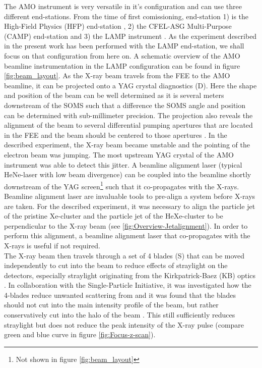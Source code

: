 The AMO instrument is very versatile in it's configuration and can use three different end-stations. From the time of first comissioning, end-station 1) is the High-Field Physics (HFP) end-station \citep{Bozek-2009-EPJST,Bostedt-2013-JPB}, 2) the CFEL-ASG Multi-Purpose (CAMP) end-station \citep{Strueder-2010-NIMPA} and 3) the LAMP instrument \citep{Ferguson-2015-JSR,Bucher-2016-Unpublished}. As the experiment described in the present work has been performed with the LAMP end-station, we shall focus on that configuration from here on. A schematic overview of the AMO beamline instrumentation in the LAMP configuration can be found in figure \ref{fig:beam_layout}. As the X-ray beam travels from the FEE to the AMO beamline, it can be projected onto a YAG crystal diagnostics (D). Here the shape and position of the beam can be well determined as it is several meters downstream of the SOMS such that a difference the SOMS angle and position can be determined with sub-millimeter precision. The projection also reveals the alignment of the beam to several differential pumping apertures that are located in the FEE and the beam should be centered to those apertures \citep{Turner-2016-PC}. In the described experiment, the X-ray beam became unstable and the pointing of the electron beam was jumping. The most upstream YAG crystal of the AMO instrument was able to detect this jitter. A beamline alignment laser (typical HeNe-laser with low beam divergence) can be coupled into the beamline shortly downstream of the YAG screen\footnote{Not shown in  figure \ref{fig:beam_layout}} such that it co-propagates with the X-rays. Beamline alignment laser are invaluable tools to pre-align a system before X-rays are taken. For the described experiment, it was necessary to align the particle jet of the pristine Xe-cluster and the particle jet of the HeXe-cluster to be perpendicular to the X-ray beam (see \ref{fig:Overview-Jetalignment}). In order to perform this alignment, a beamline alignment laser that co-propagates with the X-rays is useful if not required.\\
The X-ray beam then travels through a set of 4 blades (S) that can be moved independently to cut into the beam to reduce effects of straylight on the detectors, especially straylight originating from the Kirkpatrick-Baez (KB) optics \citep{Kirkpatrick-1948-JOSA}. In collaboration with the Single-Particle Initiative, it was investigated how the 4-blades reduce unwanted scattering from and it was found that the blades should not cut into the main intensity profile of the beam, but rather conservatively cut into the halo of the beam \citep{SPI-2015-unpublished}. This still sufficiently reduces straylight but does not reduce the peak intensity of the X-ray pulse (compare green and blue curve in figure \ref{fig:Focus-z-scan}).
